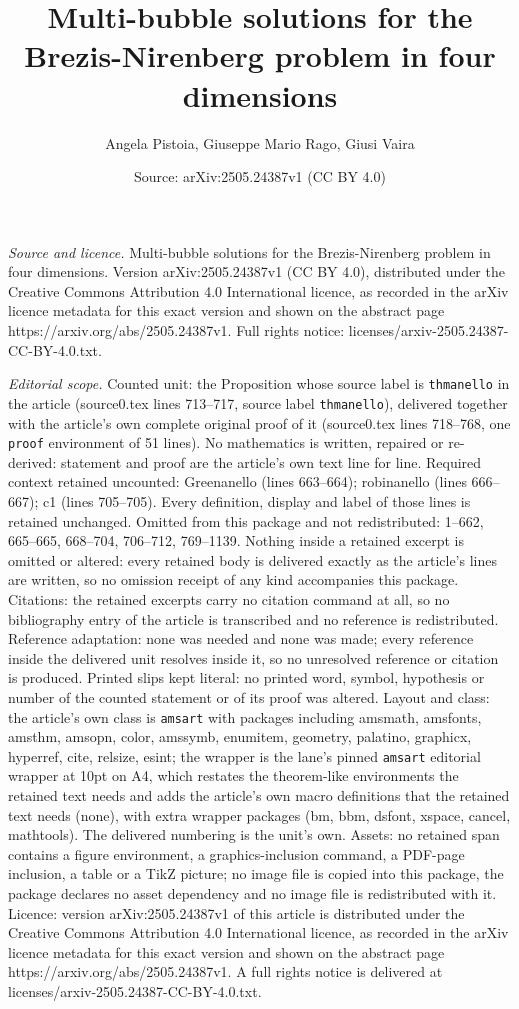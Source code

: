 \documentclass[10pt,a4paper]{amsart}
\title[Multi-bubble solutions for the Brezis-Nirenberg problem in f]{Multi-bubble solutions for the Brezis-Nirenberg problem in four dimensions}
\author{Angela Pistoia, Giuseppe Mario Rago, Giusi Vaira}
\date{Source: arXiv:2505.24387v1 (CC BY 4.0)}
\begin{document}
\maketitle

\noindent\emph{Source and licence.} Multi-bubble solutions for the Brezis-Nirenberg problem in four dimensions. Version arXiv:2505.24387v1 (CC BY 4.0), distributed under the Creative Commons Attribution 4.0 International licence, as recorded in the arXiv licence metadata for this exact version and shown on the abstract page https://arxiv.org/abs/2505.24387v1. Full rights notice: licenses/arxiv-2505.24387-CC-BY-4.0.txt.\par\smallskip

\noindent\textit{Editorial scope.} Counted unit: the Proposition whose source label is \texttt{thmanello} in the article (source0.tex lines 713--717, source label \texttt{thmanello}), delivered together with the article's own complete original proof of it (source0.tex lines 718--768, one \texttt{proof} environment of 51 lines). No mathematics is written, repaired or re-derived: statement and proof are the article's own text line for line. Required context retained uncounted: Greenanello (lines 663--664); robinanello (lines 666--667); c1 (lines 705--705). Every definition, display and label of those lines is retained unchanged. Omitted from this package and not redistributed: 1--662, 665--665, 668--704, 706--712, 769--1139. Nothing inside a retained excerpt is omitted or altered: every retained body is delivered exactly as the article's lines are written, so no omission receipt of any kind accompanies this package. Citations: the retained excerpts carry no citation command at all, so no bibliography entry of the article is transcribed and no reference is redistributed. Reference adaptation: none was needed and none was made; every reference inside the delivered unit resolves inside it, so no unresolved reference or citation is produced. Printed slips kept literal: no printed word, symbol, hypothesis or number of the counted statement or of its proof was altered. Layout and class: the article's own class is \texttt{amsart} with packages including amsmath, amsfonts, amsthm, amsopn, color, amssymb, enumitem, geometry, palatino, graphicx, hyperref, cite, relsize, esint; the wrapper is the lane's pinned \texttt{amsart} editorial wrapper at 10pt on A4, which restates the theorem-like environments the retained text needs and adds the article's own macro definitions that the retained text needs (none), with extra wrapper packages (bm, bbm, dsfont, xspace, cancel, mathtools). The delivered numbering is the unit's own. Assets: no retained span contains a figure environment, a graphics-inclusion command, a PDF-page inclusion, a table or a TikZ picture; no image file is copied into this package, the package declares no asset dependency and no image file is redistributed with it. Licence: version arXiv:2505.24387v1 of this article is distributed under the Creative Commons Attribution 4.0 International licence, as recorded in the arXiv licence metadata for this exact version and shown on the abstract page https://arxiv.org/abs/2505.24387v1. A full rights notice is delivered at licenses/arxiv-2505.24387-CC-BY-4.0.txt. 
\end{document}
